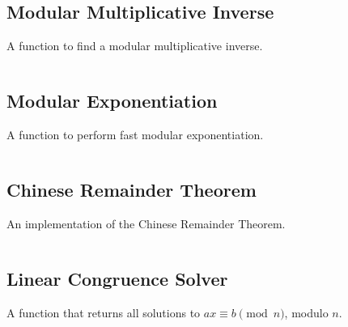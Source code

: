 \documentclass[9pt,a4paper,twocolumn,landscape,oneside]{amsart}
\newcommand{\code}[1]{\inputminted{cpp}{_code/#1}}
\begin{document}
    \subsection{Modular Multiplicative Inverse}
        A function to find a modular multiplicative inverse.
        \code{mathematics/mod_inv.cpp}

    \subsection{Modular Exponentiation}
        A function to perform fast modular exponentiation.
        \code{mathematics/mod_pow.cpp}

    \subsection{Chinese Remainder Theorem}
        An implementation of the Chinese Remainder Theorem.
        \code{mathematics/crt.cpp}

    \subsection{Linear Congruence Solver}
        A function that returns all solutions to $ax \equiv b \pmod{n}$, modulo $n$.
        \code{mathematics/linear_congruence.cpp}
\end{document}
